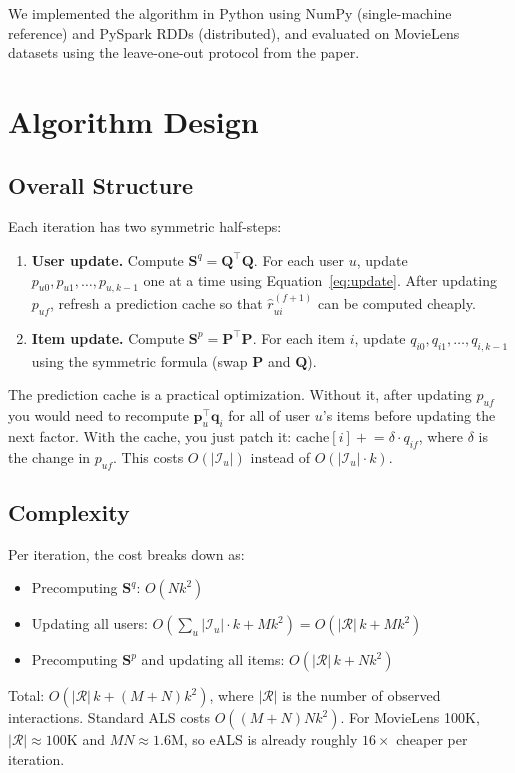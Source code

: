 \documentclass[11pt,a4paper]{article}
\begin{document}
We implemented the algorithm in Python using NumPy (single-machine reference) and PySpark RDDs (distributed), and evaluated on MovieLens datasets using the leave-one-out protocol from the paper.


\section{Algorithm Design}

\subsection{Overall Structure}

Each iteration has two symmetric half-steps:

\begin{enumerate}
\item \textbf{User update.} Compute $\mathbf{S}^q = \mathbf{Q}^\top \mathbf{Q}$. For each user $u$, update $p_{u0}, p_{u1}, \ldots, p_{u,k-1}$ one at a time using Equation~\ref{eq:update}. After updating $p_{uf}$, refresh a prediction cache so that $\hat{r}_{ui}^{(f+1)}$ can be computed cheaply.

\item \textbf{Item update.} Compute $\mathbf{S}^p = \mathbf{P}^\top \mathbf{P}$. For each item $i$, update $q_{i0}, q_{i1}, \ldots, q_{i,k-1}$ using the symmetric formula (swap $\mathbf{P}$ and $\mathbf{Q}$).
\end{enumerate}

The prediction cache is a practical optimization. Without it, after updating $p_{uf}$ you would need to recompute $\mathbf{p}_u^\top \mathbf{q}_i$ for all of user $u$'s items before updating the next factor. With the cache, you just patch it: $\text{cache}[i] \mathrel{+}= \delta \cdot q_{if}$, where $\delta$ is the change in $p_{uf}$. This costs $O(|\mathcal{I}_u|)$ instead of $O(|\mathcal{I}_u| \cdot k)$.

\subsection{Complexity}

Per iteration, the cost breaks down as:
\begin{itemize}
\item Precomputing $\mathbf{S}^q$: $O(Nk^2)$
\item Updating all users: $O\!\left(\sum_u |\mathcal{I}_u| \cdot k + M k^2\right) = O(|\mathcal{R}|\,k + Mk^2)$
\item Precomputing $\mathbf{S}^p$ and updating all items: $O(|\mathcal{R}|\,k + Nk^2)$
\end{itemize}
Total: $O(|\mathcal{R}|\,k + (M+N)k^2)$, where $|\mathcal{R}|$ is the number of observed interactions. Standard ALS costs $O((M+N)Nk^2)$. For MovieLens 100K, $|\mathcal{R}| \approx 100\text{K}$ and $MN \approx 1.6\text{M}$, so eALS is already roughly $16\times$ cheaper per iteration.
\end{document}
